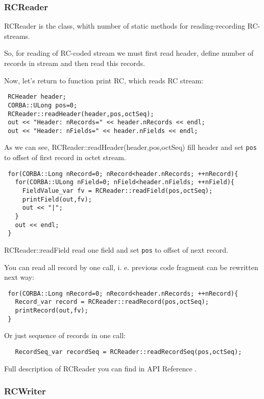 \documentclass[10pt]{article}
\begin{document}
\subsubsection{ RCReader }

RCReader is the class, whith number of static methods for reading-recording RC-streams.

 So, for reading of RC-coded stream we must first read
 header, define number of records in stream and then read this
 records.

 Now, let's return to function print RC, which reads RC stream:
 
\begin{verbatim}
 RCHeader header;
 CORBA::ULong pos=0;
 RCReader::readHeader(header,pos,octSeq);
 out << "Header: nRecords=" << header.nRecords << endl;
 out << "Header: nFields=" << header.nFields << endl;
\end{verbatim}

 As we can see, RCReader::readHeader(header,pos,octSeq) fill header
 and set \verb|pos| to offset of first record in octet stream.

\begin{verbatim}
 for(CORBA::Long nRecord=0; nRecord<header.nRecords; ++nRecord){
   for(CORBA::ULong nField=0; nField<header.nFields; ++nField){
     FieldValue_var fv = RCReader::readField(pos,octSeq);
     printField(out,fv);
     out << "|";
   }
   out << endl;
 }
\end{verbatim}

 RCReader::readField read one field and set \verb|pos| to offset of
next record.

 You can read all record by one call, i. e. previous code fragment
 can be rewritten next way:
 
\begin{verbatim}
 for(CORBA::Long nRecord=0; nRecord<header.nRecords; ++nRecord){
   Record_var record = RCReader::readRecord(pos,octSeq);
   printRecord(out,fv);
 }
\end{verbatim}

 Or just sequence of records in one call:

\begin{verbatim}
   RecordSeq_var recordSeq = RCReader::readRecordSeq(pos,octSeq);
\end{verbatim}

 Full description of RCReader you can find in API Reference .

\subsubsection{ RCWriter }
\end{document}
